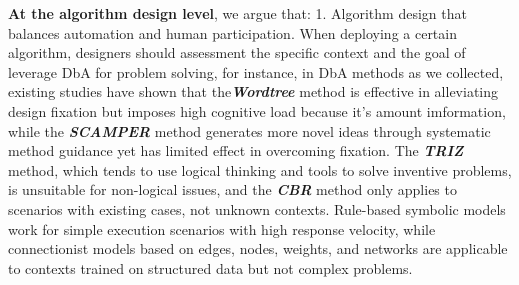 \textbf{At the algorithm design level}, we argue that: 
1. Algorithm design that balances automation and human participation. When deploying a certain algorithm, designers should assessment the specific context and the goal of leverage DbA for problem solving, for instance, in DbA methods as we collected, existing studies have shown that the\textit{\textbf{Wordtree}} method is effective in alleviating design fixation but imposes high cognitive load because it's amount imformation, while the \textit{\textbf{SCAMPER}} method generates more novel ideas through systematic method guidance yet has limited effect in overcoming fixation\cite{moreno2016overcoming}. The \textbf{\textit{TRIZ}} method, which tends to use logical thinking and tools to solve inventive problems\cite{ilevbare2013review}, is unsuitable for non-logical issues, and the \textbf{\textit{CBR}} method only applies to scenarios with existing cases, not unknown contexts\cite{wills1994towards}. Rule-based symbolic models work for simple execution scenarios with high response velocity, while connectionist models based on edges, nodes, weights, and networks are applicable to contexts trained on structured data but not complex problems\cite{jiang2022data}.


